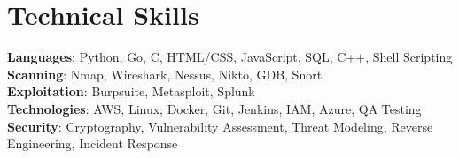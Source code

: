 \documentclass[letterpaper,11pt]{article}
\begin{document}
%
\section{Technical Skills}
 \begin{itemize}[leftmargin=0.15in, label={}]
    \small{\item{
     \textbf{Languages}{: Python, Go, C, HTML/CSS, JavaScript, SQL, C++, Shell Scripting} \\
     \textbf{Scanning}{: Nmap, Wireshark, Nessus, Nikto, GDB, Snort} \\
     \textbf{Exploitation}{: Burpsuite, Metasploit, Splunk} \\
     \textbf{Technologies}{: AWS, Linux, Docker, Git, Jenkins, IAM, Azure, QA Testing} \\
     \textbf{Security}{: Cryptography, Vulnerability Assessment, Threat Modeling, Reverse Engineering, Incident Response} \\
    }}
 \end{itemize}
 \vspace{-16pt}
\end{document}
